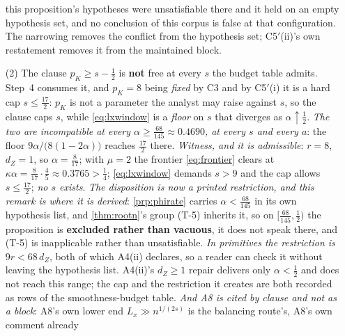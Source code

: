 \begin{remark}
\begin{enumerate}
this proposition's hypotheses were unsatisfiable there and it held on an empty hypothesis set, and no
conclusion of this corpus is false at that configuration. The narrowing removes the conflict from the
hypothesis set; C5$'$(ii)'s own restatement removes it from the maintained block.
\item[(2)] The clause $p_K\ge s-\tfrac12$ is \textbf{not} free at every $s$ the budget table
admits.  Step~4 consumes it, and $p_K=8$ being \emph{fixed} by C3 and by C5$'$(i) it is
a hard cap $s\le\tfrac{17}2$: $p_K$ is not a parameter the analyst may raise against $s$, so the clause
caps $s$, while \eqref{eq:lxwindow} is a \emph{floor} on $s$ that diverges as $\alpha\uparrow\tfrac12$.
\emph{The two are incompatible at every $\alpha\ge\tfrac{68}{145}\approx0.4690$, at every $s$ and every
$a$}: the floor $9\alpha/\big(8(1-2\alpha)\big)$ reaches $\tfrac{17}2$ there. \emph{Witness, and it is
admissible}: $r=8$, $d_Z=1$, so $\alpha=\tfrac8{17}$; with $\mu=2$ the frontier \eqref{eq:frontier}
clears at $\kappa\alpha=\tfrac{8}{17}\cdot\tfrac45\approx0.3765>\tfrac14$; \eqref{eq:lxwindow} demands
$s>9$ and the cap allows $s\le\tfrac{17}2$; \emph{no $s$ exists}.
\emph{The disposition is now a printed restriction, and this remark is where it is derived}:
\cref{prp:phirate} carries $\alpha<\tfrac{68}{145}$ in its own hypothesis list, and
\cref{thm:rootn}'s group (T-5) inherits it, so on $[\tfrac{68}{145},\tfrac12)$ the proposition is
\textbf{excluded rather than vacuous}, it does not speak there, and (T-5) is inapplicable rather
than unsatisfiable. \emph{In primitives the restriction is $9r<68\,d_Z$}, both of which A4(ii)
declares, so a reader can check it without leaving the hypothesis list.
A4(ii)'s $d_Z\ge1$ repair delivers only $\alpha<\tfrac12$ and does not reach this
range; the cap and the restriction it creates are both recorded as rows of the smoothness-budget
table. \emph{And A8 is cited by clause and not
as a block}: A8's own lower end $L_x\gg n^{1/(2s)}$ is the balancing route's, A8's own comment already

\end{enumerate}
\end{remark}
